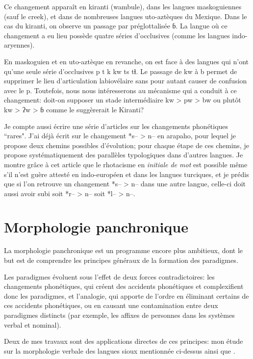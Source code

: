 \documentclass[oldfontcommands,oneside,a4paper,11pt]{memoir}
\begin{document}
Ce changement apparaît en kiranti (wambule), dans les langues maskoguiennes (sauf le creek), et dans de nombreuses langues uto-aztèques du Mexique. Dans le cas du kiranti, on observe un passage par préglottalisée ɓ. La langue où ce changement a eu lieu possède quatre séries d'occlusives (comme les langues indo-aryennes).

En maskoguien et en uto-aztèque en revanche, on est face à des langues qui n'ont qu'une seule série d'occlusives p t k kw ts tɬ. Le passage de kw à b permet de supprimer le lieu d'articulation labiovélaire sans pour autant causer de confusion avec le p. Toutefois, nous nous intéresserons au mécanisme qui a conduit à ce changement: doit-on supposer un stade intermédiaire kw > pw > bw ou plutôt kw > ʔw > ɓ comme le suggèrerait le Kiranti?


Je compte aussi écrire une série d'articles sur les changements phonétiques ``rares". J'ai déjà écrit \citet{jacques13arapaho} sur le changement *s-- > n-- en arapaho, pour lequel je propose deux chemins possibles d'évolution; pour chaque étape de ces chemins, je propose systématiquement des parallèles typologiques dans d'autres langues. Je montre grâce à cet article que  le rhotacisme en \textit{initiale de mot} est possible même s'il n'est guère attesté en indo-européen et dans les langues turciques, et je prédis que si l'on retrouve un changement *s-- > n-- dans une autre langue, celle-ci doit aussi avoir subi soit *r-- > n-- soit *l-- > n--.

\section{Morphologie panchronique} \label{sec:panchrm}
La morphologie panchronique est un programme encore plus ambitieux, dont le but est de comprendre les principes généraux de la formation des paradigmes. 
 
Les paradigmes évoluent sous l'effet de deux forces contradictoires: les changements phonétiques, qui créent des accidents phonétiques et complexifient donc les paradigmes, et l'analogie, qui apporte de l'ordre en éliminant certains de ces accidents phonétiques, ou en causant une contamination entre deux paradigmes distincts (par exemple, les affixes de personnes dans les systèmes verbal et nominal). 
 
Deux de mes travaux sont des applications directes de ces principes: mon étude sur la morphologie verbale des langues sioux mentionnée ci-dessus ainsi que \citet{jacques12agreement}.  
\end{document}
